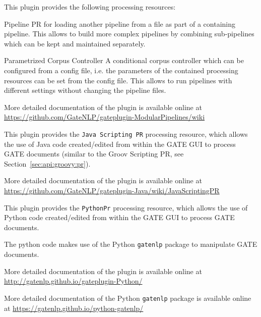 %
%
This plugin provides the following processing resources:

\begin{plist}
\item{Pipeline PR} for loading another pipeline from a file as part of a containing pipeline. This allows to build 
  more complex pipelines by combining sub-pipelines which can be kept and maintained separately. 
\item{Parametrized Corpus Controller} A conditional corpus controller which can be configured from a config file,
  i.e. the parameters of the contained processing resources can be set from the config file. This allows to 
  run pipelines with different settings without changing the pipeline files. 
\end{plist}

More detailed documentation of the plugin is available online at
\url{https://github.com/GateNLP/gateplugin-ModularPipelines/wiki}


%
%
This plugin provides the \texttt{Java Scripting PR} processing resource, which 
allows the use of Java code created/edited from within the GATE GUI to 
process GATE documents (similar to the Groov Scripting PR, see Section~\ref{sec:api:groovy:pr}). 

More detailed documentation of the plugin is available online at
\url{https://github.com/GateNLP/gateplugin-Java/wiki/JavaScriptingPR}


%
%
This plugin provides the \texttt{PythonPr} processing resource, which 
allows the use of Python code created/edited from within the GATE GUI to 
process GATE documents.

The python code makes use of the Python \texttt{gatenlp} package to manipulate 
GATE documents. 

More detailed documentation of the plugin is available online at
\url{http://gatenlp.github.io/gateplugin-Python/}

More detailed documentation of the Python \texttt{gatenlp} package is available online at
\url{https://gatenlp.github.io/python-gatenlp/}





